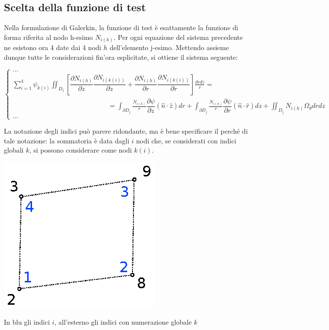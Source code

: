 \documentclass{tufte-handout}
\newcommand{\de}[2]{\dfrac{\partial #1}{\partial #2}}
\begin{document}
\subsection{Scelta della funzione di test}
Nella formulazione di Galerkin, la funzione di test è esattamente la funzione di forma riferita al nodo h-esimo $N_{i(h)}$. Per ogni equazione del sistema precedente ne esistono ora 4 date dai 4 nodi $h$ dell'elemento j-esimo. Mettendo assieme dunque tutte le considerazioni fin'ora esplicitate, si ottiene il sistema seguente:
\begin{fullwidth}
\[\begin{cases}
    ...\\
    \sum_{i=1}^4 \psi_{k(i)}
     \iint_{D_j} \left[
          \de{N_{i(h)}}{z}\de{N_{i(k(i))}}{z}
        + \de{N_{i(h)}}{r}\de{N_{i(k(i))}}{r}
    \right] \frac{dr dz}{r}= \\
    \qquad\qquad\qquad\qquad\qquad\qquad\qquad=
    \int_{\partial D_j}\frac{N_{i(h)}}{r}\de{\psi}{z} (\hat{n}\cdot \hat{z})dr
    +
    \int_{\partial D_j}\frac{N_{i(h)}}{r}\de{\psi}{r} (\hat{n}\cdot \hat{r})dz
    +\iint_{D_j} N_{i(h)}\Omega_\theta dr dz \\
    ...
\end{cases}
\]
\end{fullwidth}
La notazione degli indici può parere ridondante, ma è bene specificare il perché di tale notazione: la sommatoria è data dagli $i$ nodi che, se considerati con indici globali $k$, si possono considerare come nodi $k(i)$.

\begin{marginfigure}%
  \includegraphics[width=\linewidth]{fem/indici_elemento.eps}
  \caption{In blu gli indici $i$, all'esterno gli indici con numerazione globale $k$}
  \label{fig:indici}
\end{marginfigure}
\end{document}
